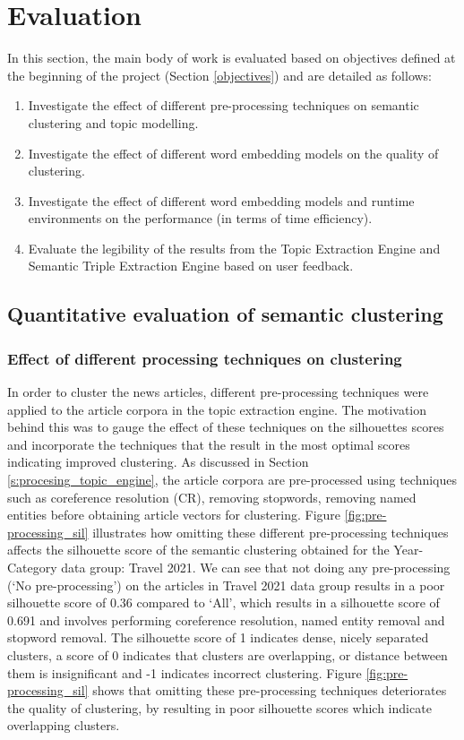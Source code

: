 \chapter{Evaluation}   \label{ch:6:eval}

In this section, the main body of work is evaluated based on objectives defined at the beginning of the project (Section \ref{objectives}) and are detailed as follows:
\begin{enumerate}
    \item Investigate the effect of different pre-processing techniques on semantic clustering and topic modelling.
    \item Investigate the effect of different word embedding models on the quality of clustering.
    \item Investigate the effect of different word embedding models and runtime environments on the performance (in terms of time efficiency).
    \item Evaluate the legibility of the results from the Topic Extraction Engine and Semantic Triple Extraction Engine based on user feedback.
\end{enumerate}

\section{Quantitative evaluation of semantic clustering} \label{s:evaluation_semantic_clustering}

\subsection{Effect of different processing techniques on clustering} \label{s:preprocess_clustering}

In order to cluster the news articles, different pre-processing techniques were applied to the article corpora in the topic extraction engine. The motivation behind this was to gauge the effect of these techniques on the silhouettes scores and incorporate the techniques that the result in the most optimal scores indicating improved clustering. As discussed in Section \ref{s:procesing_topic_engine}, the article corpora are pre-processed using techniques such as coreference resolution (CR), removing stopwords, removing named entities before obtaining article vectors for clustering. Figure \ref{fig:pre-processing_sil} illustrates how omitting these different pre-processing techniques affects the silhouette score of the semantic clustering obtained for the Year-Category data group: Travel 2021. We can see that not doing any pre-processing (`No pre-processing') on the articles in Travel 2021 data group results in a poor silhouette score of 0.36 compared to `All', which results in a silhouette score of 0.691 and involves performing coreference resolution, named entity removal and stopword removal. The silhouette score of 1 indicates dense, nicely separated clusters, a score of 0 indicates that clusters are overlapping, or distance between them is insignificant and -1 indicates incorrect clustering. Figure  \ref{fig:pre-processing_sil} shows that omitting these pre-processing techniques deteriorates the quality of clustering, by resulting in poor silhouette scores which indicate overlapping clusters.


